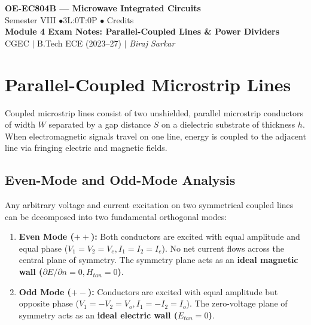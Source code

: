 \documentclass[10pt,a4paper]{article}
\begin{document}
\begin{center}
  {\LARGE\bfseries\color{myred} OE-EC804B --- Microwave Integrated Circuits}\\[5pt]
  {\normalsize\color{mydark} Semester VIII \quad$\bullet$\quad 3L:0T:0P \quad$\bullet$ Credits}\\[3pt]
  {\normalsize\color{myteal}\textbf{Module 4 Exam Notes: Parallel-Coupled Lines \& Power Dividers}}\\[3pt]
  {\small\color{mydark} CGEC \;$|$\; B.Tech ECE (2023--27) \;$|$\; \textit{Biraj Sarkar}}
\end{center}
\vspace{2pt}
\noindent{\color{myred}\rule{\linewidth}{1.5pt}}
\vspace{2pt}

\hypersetup{linkcolor=mydark}
\tableofcontents
\hypersetup{linkcolor=myteal}
\newpage

\section{Parallel-Coupled Microstrip Lines}

Coupled microstrip lines consist of two unshielded, parallel microstrip conductors of width $W$ separated by a gap distance $S$ on a dielectric substrate of thickness $h$. When electromagnetic signals travel on one line, energy is coupled to the adjacent line via fringing electric and magnetic fields.

\subsection{Even-Mode and Odd-Mode Analysis}
Any arbitrary voltage and current excitation on two symmetrical coupled lines can be decomposed into two fundamental orthogonal modes:

\begin{enumerate}[leftmargin=*, itemsep=5pt]
  \item \textbf{Even Mode ($+ +$):} Both conductors are excited with equal amplitude and equal phase ($V_1 = V_2 = V_e, I_1 = I_2 = I_e$). No net current flows across the central plane of symmetry. The symmetry plane acts as an \textbf{ideal magnetic wall ($\partial E/\partial n = 0, H_{tan} = 0$)}.
  \item \textbf{Odd Mode ($+ -$):} Conductors are excited with equal amplitude but opposite phase ($V_1 = -V_2 = V_o, I_1 = -I_2 = I_o$). The zero-voltage plane of symmetry acts as an \textbf{ideal electric wall ($E_{tan} = 0$)}.
\end{enumerate}
\end{document}
